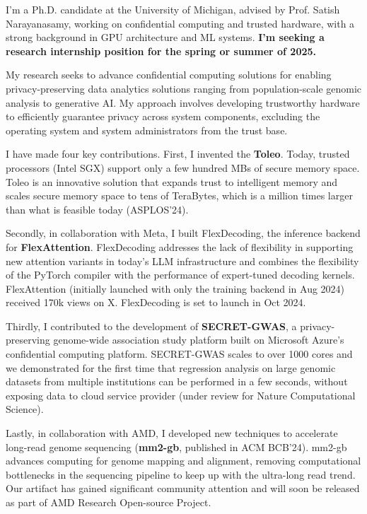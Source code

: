 I'm a Ph.D. candidate at the University of Michigan, advised by Prof. Satish Narayanasamy, working on confidential computing and trusted hardware, with a strong background in GPU architecture and ML systems. \textbf{I'm seeking a research internship position for the spring or summer of 2025. }\par
My research seeks to advance confidential computing solutions for enabling privacy-preserving data analytics solutions ranging from population-scale genomic analysis to generative AI. My approach involves developing trustworthy hardware to efficiently guarantee privacy across system components, excluding the operating system and system administrators from the trust base. \par

\vspace{3ex}

I have made four key contributions. First, I invented the \textbf{Toleo}. Today, trusted processors (Intel SGX) support only a few hundred MBs of secure memory space. Toleo is an innovative solution that expands trust to intelligent memory and scales secure memory space to tens of TeraBytes, which is a million times larger than what is feasible today (ASPLOS'24).\par


Secondly, in collaboration with Meta, I built FlexDecoding, the inference backend for \textbf{FlexAttention}. FlexDecoding addresses the lack of flexibility in supporting new attention variants in today's LLM infrastructure and combines the flexibility of the PyTorch compiler with the performance of expert-tuned decoding kernels. FlexAttention (initially launched with only the training backend in Aug 2024) received 170k views on X. FlexDecoding is set to launch in Oct 2024. \par


Thirdly, I contributed to the development of \textbf{SECRET-GWAS}, a privacy-preserving genome-wide association study platform built on Microsoft Azure's confidential computing platform.  SECRET-GWAS scales to over 1000 cores and we demonstrated for the first time that regression analysis on large genomic datasets from multiple institutions can be performed in a few seconds, without exposing data to cloud service provider (under review for Nature Computational Science).\par

Lastly, in collaboration with AMD, I developed new techniques to accelerate long-read genome sequencing (\textbf{mm2-gb}, published in ACM BCB'24). mm2-gb advances computing for genome mapping and alignment, removing computational bottlenecks in the sequencing pipeline to keep up with the ultra-long read trend. Our artifact has gained significant community attention and will soon be released as part of AMD Research Open-source Project. \par


